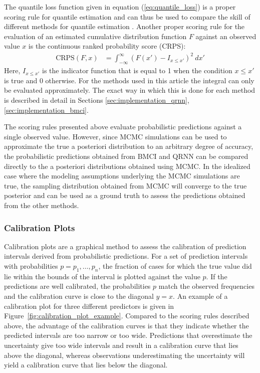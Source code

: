 \documentclass[journal abbreviation, manuscript]{copernicus}
\begin{document}
The quantile loss function given in equation (\ref{eq:quantile_loss}) is a
proper scoring rule for quantile estimation and can thus be used to compare the
skill of different methods for quantile estimation \citep{gneiting}. Another
proper scoring rule for the evaluation of an estimated cumulative distribution
function $F$ against an observed value $x$ is the continuous ranked probability
score (CRPS):
  \begin{align}\label{eq:crps}
    \text{CRPS}(F, x) &= \int_{-\infty}^{\infty} \left ( F(x') - I_{x \leq x'}
    \right )^2 \: dx'
  \end{align}
  Here, $I_{x \leq x'}$ is the indicator function that is equal to 1 when
  the condition $x \leq x'$ is true and $0$ otherwise.
  For the methods used in this article the integral can only be evaluated
  approximately. The exact way in which this is done for each method is
  described in detail in Sections \ref{sec:implementation_qrnn},
  \ref{sec:implementation_bmci}.

  The scoring rules presented above evaluate probabilistic predictions against a
  single observed value. However, since MCMC simulations can be used to
  approximate the true a posteriori distribution to an arbitrary degree of
  accuracy, the probabilistic predictions obtained from BMCI and QRNN can be
  compared directly to the a posteriori distributions obtained using MCMC. In
  the idealized case where the modeling assumptions underlying the MCMC
  simulations are true, the sampling distribution obtained from MCMC will
  converge to the true posterior and can be used as a ground truth to assess the
  predictions obtained from the other methods.
  
\subsubsection{Calibration Plots} 

Calibration plots are a graphical method to assess the calibration of prediction
intervals derived from probabilistic predictions. For a set of prediction
intervals with probabilities $p = p_1, \dots, p_n$, the fraction of cases
for which the true value did lie within the bounds of the interval is plotted
against the value $p$. If the predictions are well calibrated, the probabilities
$p$ match the observed frequencies and the calibration curve is close to the
diagonal $y = x$. An example of a calibration plot for three different
predictors is given in Figure~\ref{fig:calibration_plot_example}. Compared to the
scoring rules described above, the advantage of the calibration curves is that
they indicate whether the predicted intervals are too narrow or too wide.
Predictions that overestimate the uncertainty give too wide intervals and
result in a calibration curve that lies above the diagonal, whereas observations
underestimating the uncertainty will yield a calibration curve that lies below
the diagonal.
\end{document}
